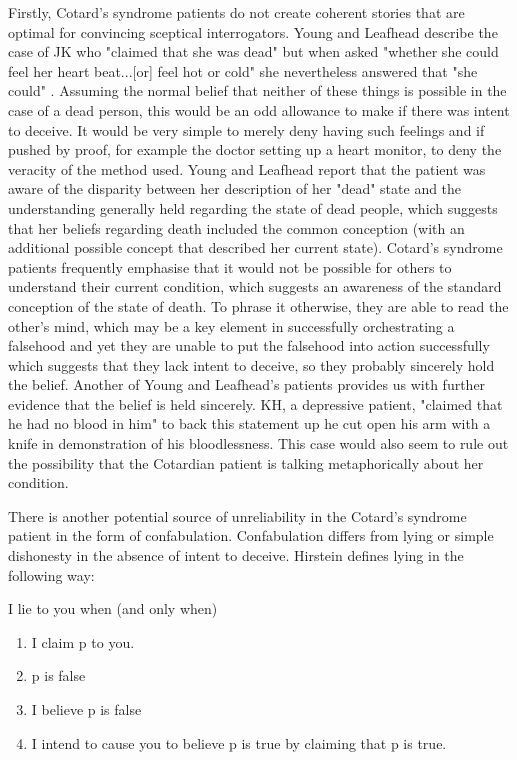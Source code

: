 Firstly, Cotard's syndrome patients do not create coherent stories that are optimal for convincing sceptical interrogators. Young and Leafhead describe the case of JK who "claimed that she was dead" \cite[p. 157]{young1995} but when asked "whether she could feel her heart beat...[or] feel hot or cold" she nevertheless answered that "she could" \cite[p. 157]{young1995}. Assuming the normal belief that neither of these things is possible in the case of a dead person, this would be an odd allowance to make if there was intent to deceive. It would be very simple to merely deny having such feelings and if pushed by proof, for example the doctor setting up a heart monitor, to deny the veracity of the method used. Young and Leafhead report that the patient was aware of the disparity between her description of her "dead" state and the understanding generally held regarding the state of dead people, which suggests that her beliefs regarding death included the common conception (with an additional possible concept that described her current state). Cotard's syndrome patients frequently emphasise that it would not be possible for others to understand their current condition, which suggests an awareness of the standard conception of the state of death. To phrase it otherwise, they are able to read the other's mind, which may be a key element in successfully orchestrating a falsehood \cite[p. 101]{hirstein2005} and yet they are unable to put the falsehood into action successfully which suggests that they lack intent to deceive, so they probably sincerely hold the belief. Another of Young and Leafhead's patients provides us with further evidence that the belief is held sincerely. KH, a depressive patient, "claimed that he had no blood in him" \cite[p. 160]{young1995} to back this statement up he cut open his arm with a knife in demonstration of his bloodlessness. This case would also seem to rule out the possibility that the Cotardian patient is talking metaphorically about her condition.

There is another potential source of unreliability in the Cotard's syndrome patient in the form of confabulation. Confabulation differs from lying or simple dishonesty in the absence of intent to deceive. Hirstein \cite[p. 16]{hirstein2005} defines lying in the following way:

\begin{displayquote}
I lie to you when (and only when) \begin{enumerate}
    \item I claim p to you.
    \item p is false
    \item I believe p is false
    \item I intend to cause you to believe p is true by claiming that p is true.
\end{enumerate}
\end{displayquote}

